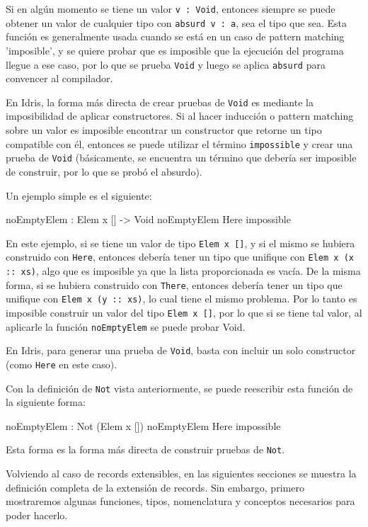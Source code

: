 Si en algún momento se tiene un valor \texttt{v : Void}, entonces siempre se puede obtener un valor de cualquier tipo con \texttt{absurd v : a}, sea el tipo que sea. Esta función es generalmente usada cuando se está en un caso de pattern matching 'imposible', y se quiere probar que es imposible que la ejecución del programa llegue a ese caso, por lo que se prueba \texttt{Void} y luego se aplica \texttt{absurd} para convencer al compilador.

En Idris, la forma más directa de crear pruebas de \texttt{Void} es mediante la imposibilidad de aplicar constructores. Si al hacer inducción o pattern matching sobre un valor es imposible encontrar un constructor que retorne un tipo compatible con él, entonces se puede utilizar el término \texttt{impossible} y crear una prueba de \texttt{Void} (básicamente, se encuentra un término que debería ser imposible de construir, por lo que se probó el absurdo).

Un ejemplo simple es el siguiente:

\begin{code}
noEmptyElem : Elem x [] -> Void
noEmptyElem Here impossible
\end{code}

En este ejemplo, si se tiene un valor de tipo \texttt{Elem x []}, y si el mismo se hubiera construido con \texttt{Here}, entonces debería tener un tipo que unifique con \texttt{Elem x (x :: xs)}, algo que es imposible ya que la lista proporcionada es vacía. De la misma forma, si se hubiera construido con \texttt{There}, entonces debería tener un tipo que unifique con \texttt{Elem x (y :: xs)}, lo cual tiene el mismo problema. Por lo tanto es imposible construir un valor del tipo \texttt{Elem x []}, por lo que si se tiene tal valor, al aplicarle la función \texttt{noEmptyElem} se puede probar Void.

En Idris, para generar una prueba de \texttt{Void}, basta con incluir un solo constructor (como \texttt{Here} en este caso).

Con la definición de \texttt{Not} vista anteriormente, se puede reescribir esta función de la siguiente forma:

\begin{code}
noEmptyElem : Not (Elem x [])
noEmptyElem Here impossible
\end{code}

Esta forma es la forma más directa de construir pruebas de \texttt{Not}.

Volviendo al caso de records extensibles, en las siguientes secciones se muestra la definición completa de la extensión de records. Sin embargo, primero mostraremos algunas funciones, tipos, nomenclatura y conceptos necesarios para poder hacerlo.

